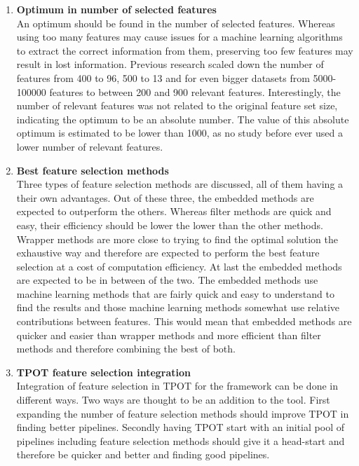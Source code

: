 \documentclass[10pt,a4paper]{article}
\begin{document}
	\begin{enumerate}
		\item \textbf{Optimum in number of selected features} \\
		An optimum should be found in the number of selected features. Whereas using too many features may cause issues for a machine learning algorithms to extract the correct information from them, preserving too few features may result in lost information. Previous research scaled down the number of features from 400 to 96\cite{pazzani1997learning}, 500 to 13 and for even bigger datasets from 5000-100000 features to between 200 and 900 relevant features\cite{chen2006combining}. Interestingly, the number of relevant features was not related to the original feature set size, indicating the optimum to be an absolute number. The value of this absolute optimum is estimated to be lower than 1000, as no study before ever used a lower number of relevant features.
		\item \textbf{Best feature selection methods} \\
		Three types of feature selection methods are discussed, all of them having a their own advantages. Out of these three, the embedded methods are expected to outperform the others. Whereas filter methods are quick and easy, their efficiency should be lower the lower than the other methods. Wrapper methods are more close to trying to find the optimal solution the exhaustive way and therefore are expected to perform the best feature selection at a cost of computation efficiency. At last the embedded methods are expected to be in between of the two. The embedded methods use machine learning methods that are fairly quick and easy to understand to find the results and those machine learning methods somewhat use relative contributions between features. This would mean that embedded methods are quicker and easier than wrapper methods and more efficient than filter methods and therefore combining the best of both.
		\item \textbf{TPOT feature selection integration} \\
		Integration of feature selection in TPOT for the framework can be done in different ways. Two ways are thought to be an addition to the tool. First expanding the number of feature selection methods should improve TPOT in finding better pipelines. Secondly having TPOT start with an initial pool of pipelines including feature selection methods should give it a head-start and therefore be quicker and better and finding good pipelines.		
	\end{enumerate}
	
\end{document}

